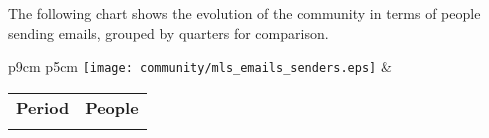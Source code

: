 The following chart shows the evolution of the community in terms of people sending emails, grouped by quarters for comparison. 

\begin{tabular}{p{9cm} p{5cm}}
    \vspace{0pt} 
    \hspace*{-6cm}  
    \texttt{[image: community/mls\_emails\_senders.eps]}
    & 
    \vspace{0pt}
    \begin{tabular}{l|l}%
    \bfseries Period & \bfseries People %
    \csvreader[head to column names]{community/mls_emails_senders.csv}{}%
    {\\\Date & \emailssenders}
    \end{tabular}
\end{tabular}